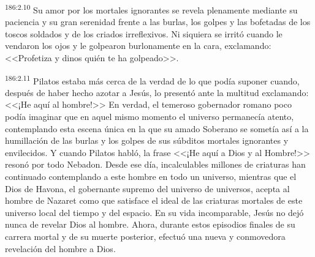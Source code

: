 \par 
\textsuperscript{186:2.10} Su amor por los mortales ignorantes se revela plenamente mediante su paciencia y su gran serenidad frente a las burlas, los golpes y las bofetadas de los toscos soldados y de los criados irreflexivos. Ni siquiera se irritó cuando le vendaron los ojos y le golpearon burlonamente en la cara, exclamando: <<Profetiza y dinos quién te ha golpeado>>.

\par 
\textsuperscript{186:2.11} Pilatos estaba más cerca de la verdad de lo que podía suponer cuando, después de haber hecho azotar a Jesús, lo presentó ante la multitud exclamando: <<¡He aquí al hombre!>> En verdad, el temeroso gobernador romano poco podía imaginar que en aquel mismo momento el universo permanecía atento, contemplando esta escena única en la que su amado Soberano se sometía así a la humillación de las burlas y los golpes de sus súbditos mortales ignorantes y envilecidos. Y cuando Pilatos habló, la frase <<¡He aquí a Dios y al Hombre!>> resonó por todo Nebadon. Desde ese día, incalculables millones de criaturas han continuado contemplando a este hombre en todo un universo, mientras que el Dios de Havona, el gobernante supremo del universo de universos, acepta al hombre de Nazaret como que satisface el ideal de las criaturas mortales de este universo local del tiempo y del espacio. En su vida incomparable, Jesús no dejó nunca de revelar Dios al hombre. Ahora, durante estos episodios finales de su carrera mortal y de su muerte posterior, efectuó una nueva y conmovedora revelación del hombre a Dios.

